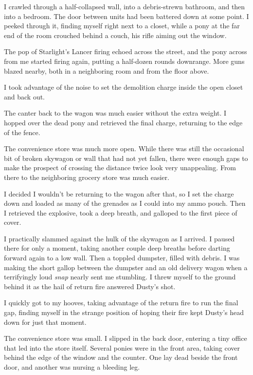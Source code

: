 I crawled through a half-collapsed wall, into a debris-strewn bathroom, and then into a bedroom. The door between units had been battered down at some point. I peeked through it, finding myself right next to a closet, while a pony at the far end of the room crouched behind a couch, his rifle aiming out the window.

The pop of Starlight’s Lancer firing echoed across the street, and the pony across from me started firing again, putting a half-dozen rounds downrange. More guns blazed nearby, both in a neighboring room and from the floor above.

I took advantage of the noise to set the demolition charge inside the open closet and back out.

The canter back to the wagon was much easier without the extra weight. I hopped over the dead pony and retrieved the final charge, returning to the edge of the fence.

The convenience store was much more open. While there was still the occasional bit of broken skywagon or wall that had not yet fallen, there were enough gaps to make the prospect of crossing the distance twice look very unappealing. From there to the neighboring grocery store was much easier.

I decided I wouldn’t be returning to the wagon after that, so I set the charge down and loaded as many of the grenades as I could into my ammo pouch. Then I retrieved the explosive, took a deep breath, and galloped to the first piece of cover.

I practically slammed against the hulk of the skywagon as I arrived. I paused there for only a moment, taking another couple deep breaths before darting forward again to a low wall. Then a toppled dumpster, filled with debris. I was making the short gallop between the dumpster and an old delivery wagon when a terrifyingly loud \textit{snap} nearly sent me stumbling. I threw myself to the ground behind it as the hail of return fire answered Dusty’s shot.

I quickly got to my hooves, taking advantage of the return fire to run the final gap, finding myself in the strange position of hoping their fire kept Dusty’s head down for just that moment.

The convenience store was small. I slipped in the back door, entering a tiny office that led into the store itself. Several ponies were in the front area, taking cover behind the edge of the window and the counter. One lay dead beside the front door, and another was nursing a bleeding leg.

